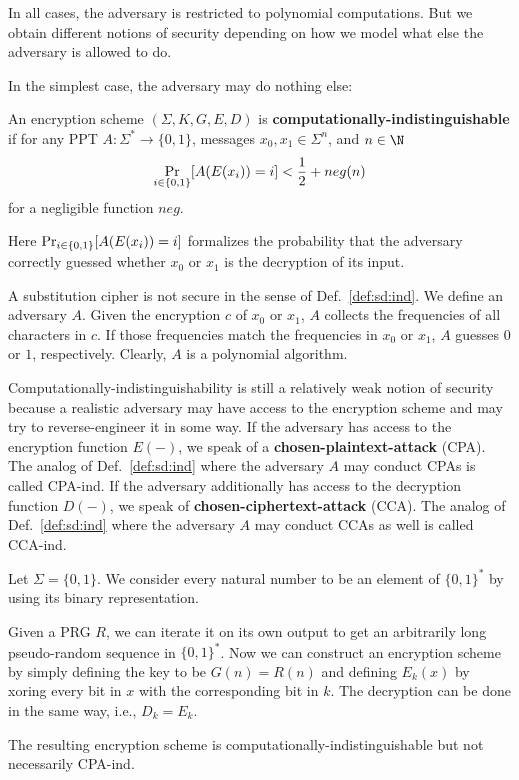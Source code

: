 In all cases, the adversary is restricted to polynomial computations.
But we obtain different notions of security depending on how we model what else the adversary is allowed to do.

In the simplest case, the adversary may do nothing else:

\begin{definition}\label{def:sd:ind}
  An encryption scheme $(\Sigma,K,G,E,D)$ is \textbf{computationally-indistinguishable} if for any PPT $A:\Sigma^*\to\{0,1\}$, messages $x_0,x_1\in\Sigma^n$, and $n\in \N$
  \[\mathop{\mathrm{Pr}}_{i\in\{0,1\}}[A(E(x_i))=i]<\frac{1}{2}+neg(n)\]
  for a negligible function $neg$.
\end{definition}

Here $\mathop{\mathrm{Pr}}_{i\in\{0,1\}}[A(E(x_i))=i]$ formalizes the probability that the adversary correctly guessed whether $x_0$ or $x_1$ is the decryption of its input.

\begin{example}
A substitution cipher is not secure in the sense of Def.~\ref{def:sd:ind}.
We define an adversary $A$.
Given the encryption $c$ of $x_0$ or $x_1$, $A$ collects the frequencies of all characters in $c$.
If those frequencies match the frequencies in $x_0$ or $x_1$, $A$ guesses $0$ or $1$, respectively.
Clearly, $A$ is a polynomial algorithm.
\end{example}

Computationally-indistinguishability is still a relatively weak notion of security because a realistic adversary may have access to the encryption scheme and may try to reverse-engineer it in some way.
If the adversary has access to the encryption function $E(-)$, we speak of a \textbf{chosen-plaintext-attack} (CPA).
The analog of Def.~\ref{def:sd:ind} where the adversary $A$ may conduct CPAs is called CPA-ind.
If the adversary additionally has access to the decryption function $D(-)$, we speak of \textbf{chosen-ciphertext-attack} (CCA).
The analog of Def.~\ref{def:sd:ind} where the adversary $A$ may conduct CCAs as well is called CCA-ind.

\begin{example}
Let $\Sigma=\{0,1\}$.
We consider every natural number to be an element of $\{0,1\}^*$ by using its binary representation.

Given a PRG $R$, we can iterate it on its own output to get an arbitrarily long pseudo-random sequence in $\{0,1\}^*$.
Now we can construct an encryption scheme by simply defining the key to be $G(n)=R(n)$ and defining $E_k(x)$ by xoring every bit in $x$ with the corresponding bit in $k$.
The decryption can be done in the same way, i.e., $D_k=E_k$.

The resulting encryption scheme is computationally-indistinguishable but not necessarily CPA-ind.
\end{example}

